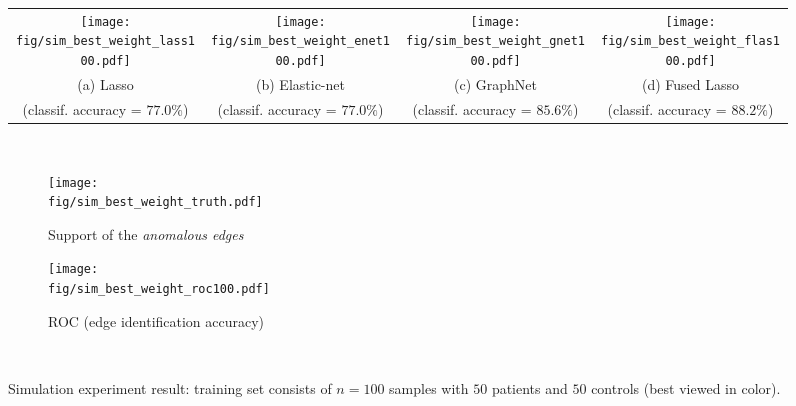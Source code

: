 \begin{figure}[ptbh]
	\centering
	\renewcommand{\imwidth} {0.23\linewidth}
	\setlength{\tabcolsep}{4.25pt} 
	\begin{tabular}{cccc}
		\texttt{[image: \\fig/sim\_best\_weight\_lass100.pdf]} &
		\texttt{[image: \\fig/sim\_best\_weight\_enet100.pdf]} &
		\texttt{[image: \\fig/sim\_best\_weight\_gnet100.pdf]} &
		\texttt{[image: \\fig/sim\_best\_weight\_flas100.pdf]} \vspace{-3pt}\\
		\small{(a) Lasso} & \small{(b) Elastic-net} & \small{(c) GraphNet} & \small{(d) Fused Lasso} \\
		\footnotesize{(classif. accuracy = $77.0\%$)} &
		\footnotesize{(classif. accuracy = $77.0\%$)} &
		\footnotesize{(classif. accuracy = $85.6\%$)} &
		\footnotesize{(classif. accuracy = $88.2\%$)} \\
	\end{tabular} \vspace{0pt}\\
	\renewcommand{\imwidth} {0.4\linewidth}	
	\begin{subfigure}[b]{\imwidth}\setcounter{subfigure}{4}
		\centering
		\texttt{[image: \\fig/sim\_best\_weight\_truth.pdf]}
		\vspace{-4pt}\\
		\caption{Support of the \emph{anomalous edges}}
		\label{subfig:sim,edge,truth}
	\end{subfigure}
	\hspace{10pt}
	\begin{subfigure}[b]{\imwidth}
		\centering
		\texttt{[image: \\fig/sim\_best\_weight\_roc100.pdf]}
		\vspace{-4pt}\\
		\caption{ROC (edge identification accuracy)}
		\label{subfig:sim,roc}
	\end{subfigure}
	\vspace{-5pt}\\
	\caption{
		Simulation experiment result: training set consists of $n=100$ samples with $50$ patients and $50$ controls (best viewed in color).  
}
\end{figure}
